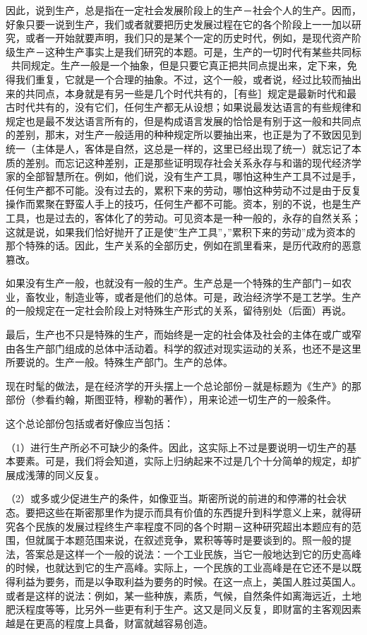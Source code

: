 \documentclass[a4paper,twoside,12pt]{ctexart}
\begin{document}
因此，说到生产，总是指在一定社会发展阶段上的生产－社会个人的生产。因而，好象只要一说到生产，我们或者就要把历史发展过程在它的各个阶段上一一加以研究，或者一开始就要声明，我们只的是某个一定的历史时代，例如，是现代资产阶级生产－这种生产事实上是我们研究的本题。可是，生产的一切时代有某些共同标，共同规定。生产一般是一个抽象，但是只要它真正把共同点提出来，定下来，免得我们重复，它就是一个合理的抽象。不过，这个一般，或者说，经过比较而抽出来的共同点，本身就是有另一些是几个时代共有的，［有些］规定是最新时代和最古时代共有的，没有它们，任何生产都无从设想；如果说最发达语言的有些规律和规定也是最不发达语言所有的，但是构成语言发展的恰恰是有别于这一般和共同点的差别，那末，对生产一般适用的种种规定所以要抽出来，也正是为了不致因见到统一（主体是人，客体是自然，这总是一样的，这里已经出现了统一）就忘记了本质的差别。而忘记这种差别，正是那些证明现存社会关系永存与和谐的现代经济学家的全部智慧所在。例如，他们说，没有生产工具，哪怕这种生产工具不过是手，任何生产都不可能。没有过去的，累积下来的劳动，哪怕这种劳动不过是由于反复操作而累聚在野蛮人手上的技巧，任何生产都不可能。资本，别的不说，也是生产工具，也是过去的，客体化了的劳动。可见资本是一种一般的，永存的自然关系；这就是说，如果我们恰好抛开了正是使”生产工具”，”累积下来的劳动”成为资本的那个特殊的话。因此，生产关系的全部历史，例如在凯里看来，是历代政府的恶意篡改。

如果没有生产一般，也就没有一般的生产。生产总是一个特殊的生产部门－如农业，畜牧业，制造业等，或者是他们的总体。可是，政治经济学不是工艺学。生产的一般规定在一定社会阶段上对特殊生产形式的关系，留待别处（后面）再说。

最后，生产也不只是特殊的生产，而始终是一定的社会体及社会的主体在或广或窄由各生产部门组成的总体中活动着。科学的叙述对现实运动的关系，也还不是这里所要说的。生产一般。特殊生产部门。生产的总体。

现在时髦的做法，是在经济学的开头摆上一个总论部份－就是标题为《生产》的那部份（参看约翰，斯图亚特，穆勒的著作），用来论述一切生产的一般条件。

这个总论部份包括或者好像应当包括：

（1）进行生产所必不可缺少的条件。因此，这实际上不过是要说明一切生产的基本要素。可是，我们将会知道，实际上归纳起来不过是几个十分简单的规定，却扩展成浅薄的同义反复。

（2）或多或少促进生产的条件，如像亚当。斯密所说的前进的和停滞的社会状态。要把这些在斯密那里作为提示而具有价值的东西提升到科学意义上来，就得研究各个民族的发展过程终生产率程度不同的各个时期－这种研究超出本题应有的范围，但就属于本题范围来说，在叙述竞争，累积等等时是要谈到的。照一般的提法，答案总是这样一个一般的说法：一个工业民族，当它一般地达到它的历史高峰的时候，也就达到它的生产高峰。实际上，一个民族的工业高峰是在它还不是以既得利益为要务，而是以争取利益为要务的时候。在这一点上，美国人胜过英国人。或者是这样的说法：例如，某一些种族，素质，气候，自然条件如离海远近，土地肥沃程度等等，比另外一些更有利于生产。这又是同义反复，即财富的主客观因素越是在更高的程度上具备，财富就越容易创造。
\end{document}
